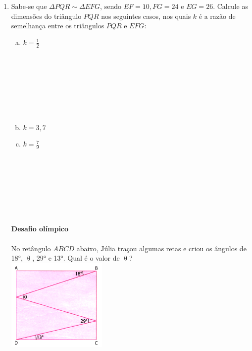 \documentclass[a4paper,14pt]{article}
\begin{document}
\begin{multicols}{2}
\begin{enumerate}
			\item Sabe-se que $\Delta$$PQR \sim \Delta$$EFG$, sendo $EF = 10, FG = 24$ e $EG = 26$. Calcule as dimensões do triângulo $PQR$ nos seguintes casos, nos quais $k$ é a razão de semelhança entre os triângulos $PQR$ e $EFG$:
			\begin{enumerate}[a)]
				\item $k = \frac{1}{2}$ \\\\\\\\\\\\\\\\
				\item $k = 3,7$ \newpage
				\item $k = \frac{7}{9}$ \\\\\\\\\\\\\\\\
			\end{enumerate}
			\textbf{Desafio olímpico} \\\\
			No retângulo $ABCD$ abaixo, Júlia traçou algumas retas e criou os ângulos de 18°, $\uptheta$, 29° e 13°. Qual é o valor de $\uptheta$? \\
			\includegraphics[width=1\linewidth]{6FMA145_imagens/imagem1}

\end{enumerate}
\end{multicols}
\end{document}
